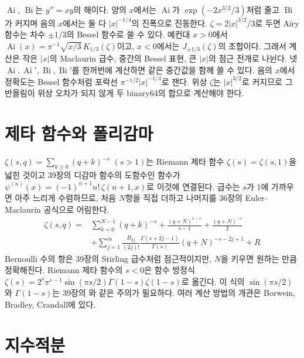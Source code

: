  $\operatorname{Ai}$, $\operatorname{Bi}$는 $y''=xy$의 해이다. 양의 $x$에서는 $\operatorname{Ai}$가 $\exp(-2x^{3/2}/3)$처럼 줄고 $\operatorname{Bi}$가 커지며 음의 $x$에서는 둘 다 $|x|^{-1/4}$의 진폭으로 진동한다. $\zeta=2|x|^{3/2}/3$로 두면 Airy 함수는 차수 $\pm1/3$의 Bessel 함수로 쓸 수 있다. 예컨대 $x>0$에서 $\operatorname{Ai}(x)=\pi^{-1}\sqrt{x/3}\,K_{1/3}(\zeta)$이고, $x<0$에서는 $J_{\pm1/3}(\zeta)$의 조합이다\cite{dlmf,vallee2004airy}. 그래서 계산은 작은 $|x|$의 Maclaurin 급수, 중간의 Bessel 표현, 큰 $|x|$의 점근 전개로 나뉜다. 넷 $\operatorname{Ai},\operatorname{Ai}',\operatorname{Bi},\operatorname{Bi}'$를 한꺼번에 계산하면 같은 중간값을 함께 쓸 수 있다. 음의 $x$에서 정확도는 Bessel 함수처럼 포락선 $\pi^{-1/2}|x|^{-1/4}$로 잰다. 위상 $\zeta$는 $|x|^{3/2}$로 커지므로 그 반올림이 위상 오차가 되지 않게 두 binary64의 합으로 계산해야 한다.

\section{제타 함수와 폴리감마}
\label{sec:zeta}

 $\zeta(s,q)=\sum_{k\ge0}(q+k)^{-s}$ $(s>1)$는 Riemann 제타 함수 $\zeta(s)=\zeta(s,1)$을 넓힌 것이고 39장의 디감마 함수의 도함수인  함수가 $\psi^{(n)}(x)=(-1)^{n+1}n!\,\zeta(n+1,x)$로 이것에 연결된다. 급수는 $s$가 $1$에 가까우면 아주 느리게 수렴하므로, 처음 $N$항을 직접 더하고 나머지를 36장의 Euler--Maclaurin 공식으로 어림한다.
\begin{align*}
\zeta(s,q)={}&\sum_{k=0}^{N-1}(q+k)^{-s}+\frac{(q+N)^{1-s}}{s-1}+\frac{(q+N)^{-s}}2\\
&+\sum_{j=1}^{m}\frac{B_{2j}}{(2j)!}\frac{\Gamma(s+2j-1)}{\Gamma(s)}(q+N)^{-s-2j+1}+R
\end{align*}
Bernoulli 수의 항은 39장의 Stirling 급수처럼 점근적이지만, $N$을 키우면 원하는 만큼 정확해진다. Riemann 제타 함수의 $s<0$은 함수 방정식 $\zeta(s)=2^s\pi^{s-1}\sin(\pi s/2)\Gamma(1-s)\zeta(1-s)$로 옮긴다. 이 식의 $\sin(\pi s/2)$와 $\Gamma(1-s)$는 39장의 와 같은 주의가 필요하다. 여러 계산 방법의 개관은 Borwein, Bradley, Crandall에 있다\cite{borwein2000zeta}.

\section{지수적분}
\label{sec:expint}

